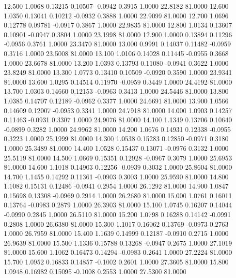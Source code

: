   12.500   1.0068   0.13215   0.10507  -0.0942   0.3915   1.0000  22.8182  81.0000
  12.600   1.0350   0.13041   0.10212  -0.0932   0.3888   1.0000  22.9099  81.0000
  12.700   1.0696   0.12778   0.09781  -0.0917   0.3867   1.0000  22.9835  81.0000
  12.800   1.0134   0.13607   0.10901  -0.0947   0.3804   1.0000  23.1998  81.0000
  12.900   1.0000   0.13894   0.11296  -0.0956   0.3761   1.0000  23.3470  81.0000
  13.000   0.9991   0.14037   0.11482  -0.0959   0.3716   1.0000  23.5008  81.0000
  13.100   1.0106   0.14028   0.11445  -0.0955   0.3668   1.0000  23.6678  81.0000
  13.200   1.0393   0.13793   0.11080  -0.0941   0.3622   1.0000  23.8249  81.0000
  13.300   1.0773   0.13410   0.10509  -0.0920   0.3590   1.0000  23.9341  81.0000
  13.600   1.0295   0.14514   0.11970  -0.0959   0.3449   1.0000  24.4192  81.0000
  13.700   1.0303   0.14660   0.12153  -0.0963   0.3413   1.0000  24.5446  81.0000
  13.800   1.0385   0.14707   0.12189  -0.0962   0.3377   1.0000  24.6691  81.0000
  13.900   1.0566   0.14609   0.12007  -0.0953   0.3341   1.0000  24.7918  81.0000
  14.000   1.0903   0.14257   0.11463  -0.0931   0.3307   1.0000  24.9076  81.0000
  14.100   1.1349   0.13706   0.10640  -0.0899   0.3282   1.0000  24.9962  81.0000
  14.200   1.0676   0.14931   0.12338  -0.0955   0.3223   1.0000  25.1999  81.0000
  14.300   1.0538   0.15283   0.12850  -0.0971   0.3180   1.0000  25.3489  81.0000
  14.400   1.0528   0.15437   0.13071  -0.0976   0.3132   1.0000  25.5119  81.0000
  14.500   1.0669   0.15351   0.12928  -0.0967   0.3079   1.0000  25.6953  81.0000
  14.600   1.1018   0.14903   0.12256  -0.0939   0.3032   1.0000  25.8604  81.0000
  14.700   1.1455   0.14292   0.11361  -0.0903   0.3003   1.0000  25.9590  81.0000
  14.800   1.1082   0.15131   0.12486  -0.0941   0.2954   1.0000  26.1292  81.0000
  14.900   1.0847   0.15698   0.13308  -0.0969   0.2914   1.0000  26.2680  81.0000
  15.000   1.0761   0.16011   0.13764  -0.0983   0.2879   1.0000  26.3903  81.0000
  15.100   1.0745   0.16207   0.14044  -0.0990   0.2845   1.0000  26.5110  81.0000
  15.200   1.0798   0.16288   0.14142  -0.0991   0.2808   1.0000  26.6380  81.0000
  15.300   1.1017   0.16062   0.13769  -0.0973   0.2763   1.0000  26.7959  81.0000
  15.400   1.1639   0.14999   0.12187  -0.0910   0.2715   1.0000  26.9639  81.0000
  15.500   1.1336   0.15788   0.13268  -0.0947   0.2675   1.0000  27.1019  81.0000
  15.600   1.1062   0.16473   0.14294  -0.0983   0.2641   1.0000  27.2224  81.0000
  15.700   1.0952   0.16833   0.14857  -0.1002   0.2601   1.0000  27.3605  81.0000
  15.800   1.0948   0.16982   0.15095  -0.1008   0.2553   1.0000  27.5300  81.0000
